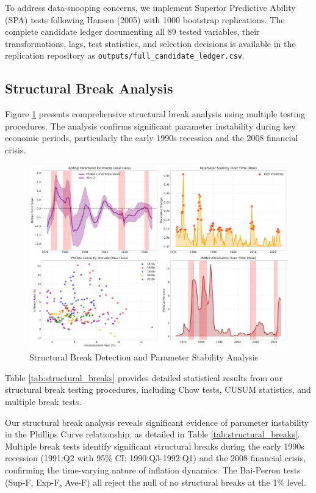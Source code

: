 \documentclass[12pt]{article}
\begin{document}
To address data-snooping concerns, we implement Superior Predictive Ability (SPA) tests following Hansen (2005) with 1000 bootstrap replications. The complete candidate ledger documenting all 89 tested variables, their transformations, lags, test statistics, and selection decisions is available in the replication repository as \texttt{outputs/full\_candidate\_ledger.csv}.

\subsection{Structural Break Analysis}

Figure \ref{fig:structural_breaks} presents comprehensive structural break analysis using multiple testing procedures. The analysis confirms significant parameter instability during key economic periods, particularly the early 1990s recession and the 2008 financial crisis.

\begin{figure}[H]
\centering
\includegraphics[width=\textwidth]{figures/structural_breaks.pdf}
\caption{Structural Break Detection and Parameter Stability Analysis}
\label{fig:structural_breaks}
\end{figure}

Table \ref{tab:structural_breaks} provides detailed statistical results from our structural break testing procedures, including Chow tests, CUSUM statistics, and multiple break tests.



Our structural break analysis reveals significant evidence of parameter instability in the Phillips Curve relationship, as detailed in Table \ref{tab:structural_breaks}. Multiple break tests identify significant structural breaks during the early 1990s recession (1991:Q2 with 95\% CI: 1990:Q3-1992:Q1) and the 2008 financial crisis, confirming the time-varying nature of inflation dynamics. The Bai-Perron tests (Sup-F, Exp-F, Ave-F) all reject the null of no structural breaks at the 1\% level.
\end{document}
